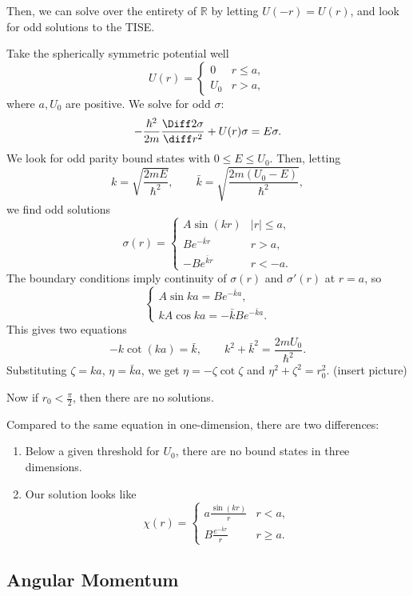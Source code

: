 \documentclass[12pt]{article}
\begin{document}
Then, we can solve over the entirety of $\mathbb{R}$ by letting $U(-r) = U(r)$, and look for odd solutions to the TISE.

\begin{exbox}
	Take the spherically symmetric potential well
	\[
		U(r) =
		\begin{cases}
			0 & r \leq a, \\
			U_0 & r > a,
		\end{cases}
	\]
	where $a, U_0$ are positive. We solve for odd $\sigma$:
	\[
		-\frac{\hbar^2}{2m} \frac{\Diff2 \sigma}{\diff r^2} + U(r) \sigma = E \sigma
	.\]
	We look for odd parity bound states with $0 \leq E \leq U_0$. Then, letting
	\[
		k = \sqrt{\frac{2mE}{\hbar^2}}, \qquad \bar k = \sqrt{\frac{2m(U_0 - E)}{\hbar^2}}
	,\]
	we find odd solutions
	\[
		\sigma(r) =
		\begin{cases}
			A \sin (kr) & |r| \leq a, \\
			B e^{-\bar k r} & r > a, \\
			-B e^{\bar k r} & r < -a.
		\end{cases}
	\]
	The boundary conditions imply continuity of $\sigma(r)$ and $\sigma'(r)$ at $r = a$, so
	\[
	\begin{cases}
		A \sin ka = B e^{-\bar k a}, \\
		k A \cos ka = -\bar k B e^{-\bar k a}.
	\end{cases}
	\]
	This gives two equations
	\[
		- k \cot (ka) = \bar k, \qquad k^2 + \bar k^2 = \frac{2mU_0}{\hbar^2}
	.\]
	Substituting $\zeta = ka$, $\eta = \bar k a$, we get $\eta = - \zeta \cot \zeta$ and $\eta^2 + \zeta^2 = r_0^2$. (insert picture)

	Now if $r_0 < \frac{\pi}{2}$, then there are no solutions.
\end{exbox}

Compared to the same equation in one-dimension, there are two differences:
\begin{enumerate}[1.]
	\item Below a given threshold for $U_0$, there are no bound states in three dimensions.
	\item Our solution looks like
		\[
			\chi(r) =
			\begin{cases}
				a \frac{\sin (kr)}{r} & r < a, \\
				B \frac{e^{-\bar k r}}{r} & r \geq a.
			\end{cases}
		\]
\end{enumerate}

\subsection{Angular Momentum}%
\label{sub:angular_momentum}
\end{document}
